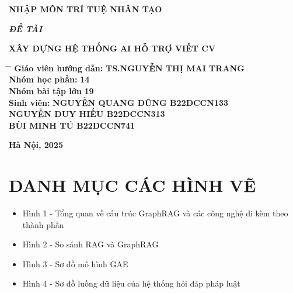 \documentclass[a4paper]{article}
\begin{document}
\begin{titlepage}
\begin{center}
			\vspace{7pt}
			\textbf{NHẬP MÔN TRÍ TUỆ NHÂN TẠO}
		\end{center}
		
		\vspace{10pt}
		\begin{flushleft}
			\fontsize{14pt}{17pt}\selectfont  
			\textbf{\textsl{ĐỀ TÀI}}
		\end{flushleft}
		\begin{center}
			\fontsize{18pt}{17pt}\selectfont 
			\textbf{\textrm{XÂY DỰNG HỆ THỐNG AI HỖ TRỢ VIẾT CV}}
		\end{center}
		
		\vspace{15pt}
		\begin{tabbing}
			\fontsize{16pt}{20pt}\selectfont
			\hspace{6cm} \= \hspace{5cm} \= \kill
			\textbf{Giáo viên hướng dẫn:} \> \textbf{TS.NGUYỄN THỊ MAI TRANG} \>\\ [6pt]
			\textbf{Nhóm học phần:} \> \textbf{14} \>\\ [6pt]
            \textbf{Nhóm bài tập lớn}\> \textbf{19} \>\\ [6pt]
			\textbf{Sinh viên:} \> \textbf{NGUYỄN QUANG DŨNG B22DCCN133} \>\\ [6pt]
            \textbf{} \> \textbf{NGUYỄN DUY HIẾU B22DCCN313} \>\\ [6pt]
            \textbf{} \> \textbf{BÙI MINH TÚ B22DCCN741} \>\\ [6pt]
			
		\end{tabbing}
		
		
		\vspace{14pt}
		\begin{center}
			\textbf{Hà Nội, 2025}
		\end{center}
	\end{titlepage}
	

\clearpage



\clearpage

\tableofcontents

\clearpage

\section*{DANH MỤC CÁC HÌNH VẼ}
\begin{itemize}
    \item Hình 1 - Tổng quan về cấu trúc GraphRAG và các công nghệ đi kèm theo thành phần \dotfill [số trang]
    \item Hình 2 - So sánh RAG và GraphRAG \dotfill [số trang]
    \item Hình 3 - Sơ đồ mô hình GAE \dotfill [số trang]
    \item Hình 4 - Sơ đồ luồng dữ liệu của hệ thống hỏi đáp pháp luật \dotfill [số trang]
\end{itemize}
\clearpage
\end{document}
